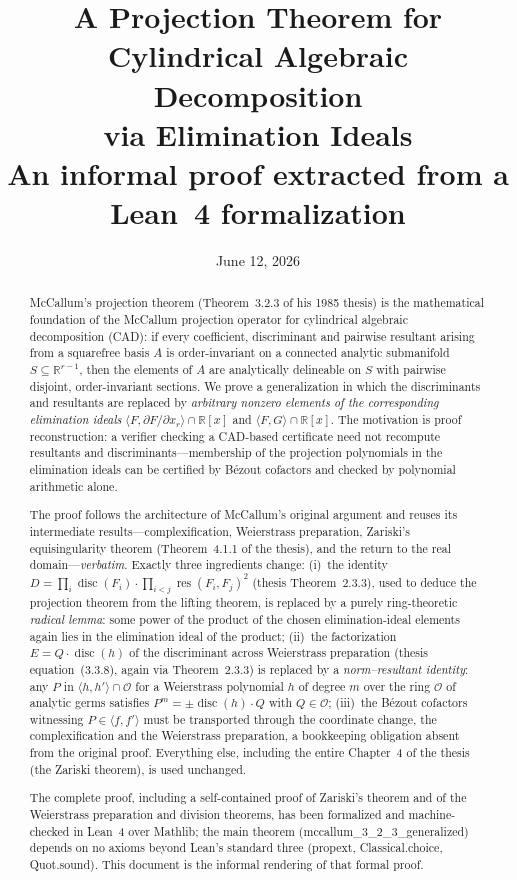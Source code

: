 \documentclass[11pt,a4paper]{article}
\title{A Projection Theorem for Cylindrical Algebraic Decomposition\\
via Elimination Ideals\\[1ex]
\large An informal proof extracted from a Lean~4 formalization}
\author{}
\date{June 12, 2026}
\theoremstyle{plain}
\theoremstyle{definition}
\newcommand{\R}{\mathbb{R}}
\DeclareMathOperator{\res}{res}
\DeclareMathOperator{\disc}{disc}
\newcommand{\ideal}[1]{\langle #1\rangle}
\newcommand{\OO}{\mathcal{O}}
\newcommand{\code}[1]{{\ttfamily\small #1}}
\begin{document}
\maketitle

\begin{abstract}
McCallum's projection theorem (Theorem~3.2.3 of his 1985 thesis) is the
mathematical foundation of the McCallum projection operator for cylindrical
algebraic decomposition (CAD): if every coefficient, discriminant and pairwise
resultant arising from a squarefree basis $A$ is order-invariant on a connected
analytic submanifold $S\subseteq\R^{r-1}$, then the elements of $A$ are
analytically delineable on $S$ with pairwise disjoint, order-invariant sections.
We prove a generalization in which the discriminants and resultants are replaced
by \emph{arbitrary nonzero elements of the corresponding elimination ideals}
$\ideal{F,\partial F/\partial x_r}\cap\R[x]$ and $\ideal{F,G}\cap\R[x]$.
The motivation is proof reconstruction: a verifier checking a CAD-based
certificate need not recompute resultants and discriminants---membership of the
projection polynomials in the elimination ideals can be certified by B\'ezout
cofactors and checked by polynomial arithmetic alone.

The proof follows the architecture of McCallum's original argument and reuses
its intermediate results---complexification, Weierstrass preparation, Zariski's
equisingularity theorem (Theorem~4.1.1 of the thesis), and the return to the
real domain---\emph{verbatim}. Exactly three ingredients change:
(i)~the identity $D=\prod_i\disc(F_i)\cdot\prod_{i<j}\res(F_i,F_j)^2$
(thesis Theorem~2.3.3), used to deduce the projection theorem from the lifting
theorem, is replaced by a purely ring-theoretic \emph{radical lemma}: some power
of the product of the chosen elimination-ideal elements again lies in the
elimination ideal of the product;
(ii)~the factorization $E=Q\cdot\disc(h)$ of the discriminant across Weierstrass
preparation (thesis equation~(3.3.8), again via Theorem~2.3.3) is replaced by a
\emph{norm--resultant identity}: any $P$ in $\ideal{h,h'}\cap\OO$ for a
Weierstrass polynomial $h$ of degree $m$ over the ring $\OO$ of analytic germs
satisfies $P^{m}=\pm\disc(h)\cdot Q$ with $Q\in\OO$;
(iii)~the B\'ezout cofactors witnessing $P\in\ideal{f,f'}$ must be transported
through the coordinate change, the complexification and the Weierstrass
preparation, a bookkeeping obligation absent from the original proof.
Everything else, including the entire Chapter~4 of the thesis (the Zariski
theorem), is used unchanged.

The complete proof, including a self-contained proof of Zariski's theorem and
of the Weierstrass preparation and division theorems, has been formalized and
machine-checked in Lean~4 over Mathlib; the main theorem
(\code{mccallum\_3\_2\_3\_generalized}) depends on no axioms beyond Lean's
standard three (\code{propext}, \code{Classical.choice}, \code{Quot.sound}).
This document is the informal rendering of that formal proof.
\end{abstract}
\end{document}
